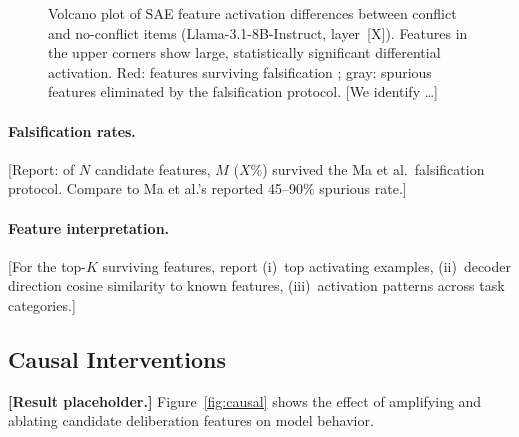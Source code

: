 \begin{figure}[t]
\centering
\caption{Volcano plot of SAE feature activation differences between
  conflict and no-conflict items (Llama-3.1-8B-Instruct, layer~[X]).
  Features in the upper corners show large, statistically significant
  differential activation.  Red: features surviving falsification
  \citep{ma2026falsification}; gray: spurious features eliminated by the
  falsification protocol.  [We identify \ldots]}
\label{fig:volcano}
\end{figure}

\paragraph{Falsification rates.}  [Report: of $N$ candidate features, $M$
($X$\%) survived the Ma et al.\ falsification protocol.  Compare to Ma et
al.'s reported 45--90\% spurious rate.]

\paragraph{Feature interpretation.}  [For the top-$K$ surviving features,
report (i)~top activating examples, (ii)~decoder direction cosine similarity
to known features, (iii)~activation patterns across task categories.]

\subsection{Causal Interventions}
\label{sec:results_causal}

\textbf{[Result placeholder.]}  Figure~\ref{fig:causal} shows the effect
of amplifying and ablating candidate deliberation features on model behavior.

